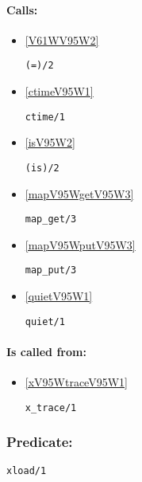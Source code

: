 \paragraph{Calls:} 
\begin{itemize}
\item \ref{V61WV95W2} 
\begin{verbatim}
(=)/2
\end{verbatim}

\item \ref{ctimeV95W1} 
\begin{verbatim}
ctime/1
\end{verbatim}

\item \ref{isV95W2} 
\begin{verbatim}
(is)/2
\end{verbatim}

\item \ref{mapV95WgetV95W3} 
\begin{verbatim}
map_get/3
\end{verbatim}

\item \ref{mapV95WputV95W3} 
\begin{verbatim}
map_put/3
\end{verbatim}

\item \ref{quietV95W1} 
\begin{verbatim}
quiet/1
\end{verbatim}

\end{itemize}
\paragraph{Is called from:} 
\begin{itemize}
\item \ref{xV95WtraceV95W1} 
\begin{verbatim}
x_trace/1
\end{verbatim}

\end{itemize}

\subsubsection{Predicate:} \label{xloadV95W1}

\begin{verbatim}
xload/1
\end{verbatim}

